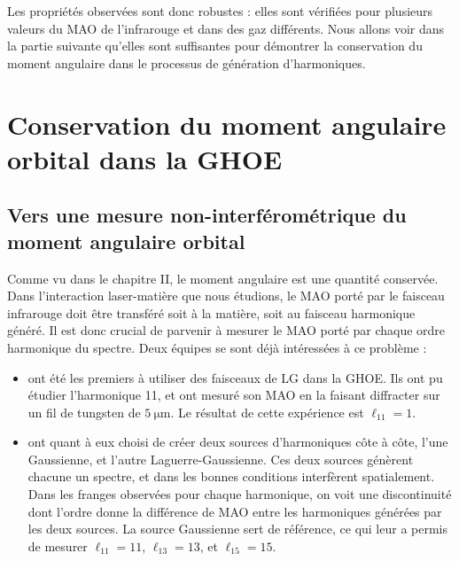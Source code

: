 Les propriétés observées sont donc robustes : elles sont vérifiées pour plusieurs valeurs du MAO de l'infrarouge et dans des gaz différents. Nous allons voir dans la partie suivante qu'elles sont suffisantes pour démontrer la conservation du moment angulaire dans le processus de génération d'harmoniques.

\section{Conservation du moment angulaire orbital dans la GHOE}
\subsection{Vers une mesure non-interférométrique du moment angulaire orbital}
Comme vu dans le chapitre II, le moment angulaire est une quantité conservée. Dans l'interaction laser-matière que nous étudions, le MAO porté par le faisceau infrarouge doit être transféré soit à la matière, soit au faisceau harmonique généré. Il est donc crucial de parvenir à mesurer le MAO porté par chaque ordre harmonique du spectre. Deux équipes se sont déjà intéressées à ce problème :

\begin{itemize} 
\item {} ont été les premiers à utiliser des faisceaux de LG dans la GHOE. Ils ont pu étudier l'harmonique 11, et ont mesuré son MAO en la faisant diffracter sur un fil de tungsten de $\SI{5}{\micro\m}$. Le résultat de cette expérience est $\ell_{11}=1$.\\
\item {} ont quant à eux choisi de créer deux sources d'harmoniques côte à côte, l'une Gaussienne, et l'autre Laguerre-Gaussienne. Ces deux sources génèrent chacune un spectre, et dans les bonnes conditions interfèrent spatialement. Dans les franges observées pour chaque harmonique, on voit une discontinuité dont l'ordre donne la différence de MAO entre les harmoniques générées par les deux sources. La source Gaussienne sert de référence, ce qui leur a permis de mesurer $\ell_{11}=11$, $\ell_{13}=13$, et $\ell_{15}=15$.\\
\end{itemize}

